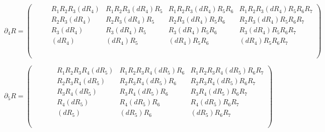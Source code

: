 {\begin{equation*}
    \partial_4 R =
    \begin{pmatrix}
            &         &             & R_1 R_2 R_3 (dR_4) & R_1 R_2 R_3 (dR_4) R_5 & R_1 R_2 R_3 (dR_4) R_5 R_6 & R_1 R_2 R_3 (dR_4) R_5 R_6 R_7 \\
            &         &             &     R_2 R_3 (dR_4) &     R_2 R_3 (dR_4) R_5 &     R_2 R_3 (dR_4) R_5 R_6 &     R_2 R_3 (dR_4) R_5 R_6 R_7 \\
            &         &             &         R_3 (dR_4) &         R_3 (dR_4) R_5 &         R_3 (dR_4) R_5 R_6 &         R_3 (dR_4) R_5 R_6 R_7 \\
            &         &             &             (dR_4) &             (dR_4) R_5 &             (dR_4) R_5 R_6 &             (dR_4) R_5 R_6 R_7 \\
            &         &             &                    &                        &                            &                                \\
            &         &             &                    &                        &                            &                                \\
            &         &             &                    &                        &                            &                                \\
    \end{pmatrix}
\end{equation*}

\begin{equation*}
    \partial_5 R =
    \begin{pmatrix}
            &         &             &                 & R_1 R_2 R_3 R_4 (dR_5) & R_1 R_2 R_3 R_4 (dR_5) R_6 & R_1 R_2 R_3 R_4 (dR_5) R_6 R_7 \\
            &         &             &                 &     R_2 R_3 R_4 (dR_5) &     R_2 R_3 R_4 (dR_5) R_6 &     R_2 R_3 R_4 (dR_5) R_6 R_7 \\
            &         &             &                 &         R_3 R_4 (dR_5) &         R_3 R_4 (dR_5) R_6 &         R_3 R_4 (dR_5) R_6 R_7 \\
            &         &             &                 &             R_4 (dR_5) &             R_4 (dR_5) R_6 &             R_4 (dR_5) R_6 R_7 \\
            &         &             &                 &                 (dR_5) &                 (dR_5) R_6 &                 (dR_5) R_6 R_7 \\
            &         &             &                 &                        &                            &                                \\
            &         &             &                 &                        &                            &                                \\
    \end{pmatrix}
\end{equation*}

}
